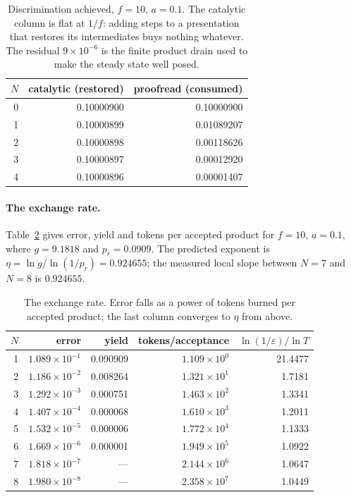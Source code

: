 \documentclass[11pt]{article}
\theoremstyle{plain}
\theoremstyle{definition}
\theoremstyle{remark}
\begin{document}
\begin{table}[h]
\centering
\begin{tabular}{@{}rrr@{}}
\toprule
$N$ & catalytic (restored) & proofread (consumed) \\
\midrule
0 & 0.10000900 & 0.10000900 \\
1 & 0.10000899 & 0.01089207 \\
2 & 0.10000898 & 0.00118626 \\
3 & 0.10000897 & 0.00012920 \\
4 & 0.10000896 & 0.00001407 \\
\bottomrule
\end{tabular}
\caption{Discrimination achieved, $f = 10$, $a = 0.1$. The catalytic column
is flat at $1/f$: adding steps to a presentation that restores its
intermediates buys nothing whatever. The residual $9\times10^{-6}$ is the
finite product drain used to make the steady state well posed.}
\label{tab:e1}
\end{table}

\paragraph{The exchange rate.}
Table~\ref{tab:e2} gives error, yield and tokens per accepted product for
$f = 10$, $a = 0.1$, where $g = 9.1818$ and $p_r = 0.0909$. The predicted
exponent is $\eta = \ln g / \ln (1/p_r) = 0.924655$; the measured local slope
between $N = 7$ and $N = 8$ is $0.924655$.

\begin{table}[h]
\centering
\begin{tabular}{@{}rrrrr@{}}
\toprule
$N$ & error & yield & tokens/acceptance & $\ln(1/\varepsilon)/\ln T$ \\
\midrule
1 & $1.089\times10^{-1}$ & 0.090909 & $1.109\times10^{0}$ & 21.4477 \\
2 & $1.186\times10^{-2}$ & 0.008264 & $1.321\times10^{1}$ & 1.7181 \\
3 & $1.292\times10^{-3}$ & 0.000751 & $1.463\times10^{2}$ & 1.3341 \\
4 & $1.407\times10^{-4}$ & 0.000068 & $1.610\times10^{3}$ & 1.2011 \\
5 & $1.532\times10^{-5}$ & 0.000006 & $1.772\times10^{4}$ & 1.1333 \\
6 & $1.669\times10^{-6}$ & 0.000001 & $1.949\times10^{5}$ & 1.0922 \\
7 & $1.818\times10^{-7}$ & --- & $2.144\times10^{6}$ & 1.0647 \\
8 & $1.980\times10^{-8}$ & --- & $2.358\times10^{7}$ & 1.0449 \\
\bottomrule
\end{tabular}
\caption{The exchange rate. Error falls as a power of tokens burned per
accepted product; the last column converges to $\eta$ from above.}
\label{tab:e2}
\end{table}
\end{document}
